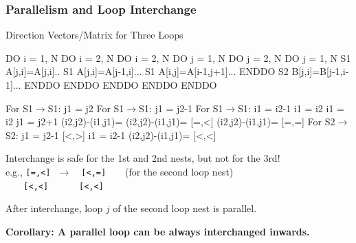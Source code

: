 \documentclass{beamer}
\renewcommand{\emph}[1]{\textcolor{CosGreen}{ #1}}
\newcommand{\emp}[1]{\textcolor{DikuRed}{ #1}}
\newcommand{\mymath}[1]{$ #1 $}
\begin{document}
\begin{frame}[fragile,t]
  \frametitle{Parallelism and Loop Interchange} 

\begin{block}{Direction Vectors/Matrix for Three Loops }
\begin{colorcode}
  DO i = 1, N           DO i = 2, N             DO i = 2, N
    DO j = 1, N          DO j = 2, N             DO j = 1, N 
S1    A[j,i]=A[j,i]..  S1  A[j,i]=A[j-1,i]...   S1 A[i,j]=A[i-1,j+1]...
    ENDDO              S2  B[j,i]=B[j-1,i-1]...  ENDDO
  ENDDO                 ENDDO ENDDO             ENDDO

For S1\mymath{\rightarrow}S1: j1 = j2    For S1\mymath{\rightarrow}S1: j1 = j2-1   For S1\mymath{\rightarrow}S1: i1 = i2-1
            i1 = i2                i1 = i2                j1 = j2+1
(i2,j2)-(i1,j1)=         (i2,j2)-(i1,j1)=\emp{[=,<]}  (i2,j2)-(i1,j1)=
\emp{[=,=]}                  For S2\mymath{\rightarrow}S2: j1 = j2-1        \emp{[<,>]}
                                   i1 = i2-1
                         (i2,j2)-(i1,j1)=\emp{[<,<]}
\end{colorcode}
\end{block} 

Interchange is safe for the 1st and 2nd nests, but not for the 3rd!\\
e.g., \emp{\tt [=,<]}$~~~\rightarrow~~~$ \emph{\tt [<,=]}$~~~~~~~~~$(for the second loop nest)\\
$~~~~~~~$\emp{\tt [<,<]}$~~~~~~~~~~~~~$\emph{\tt [<,<]}

\pause\smallskip

After interchange, loop $j$ of the second loop nest is parallel.

\bigskip

\emph{\bf Corollary: A parallel loop can be always interchanged inwards.}
\end{frame}
\end{document}
